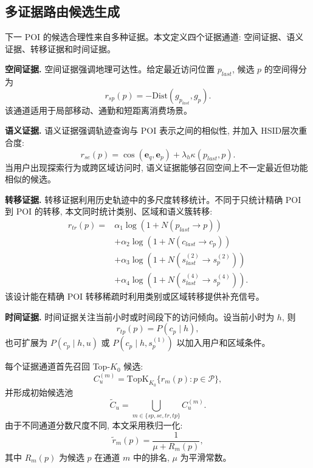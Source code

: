 \documentclass[10pt,twocolumn,fontset=none]{ctexart}
\newcommand{\hsid}{HSID}
\begin{document}
\subsection{多证据路由候选生成}
下一 POI 的候选合理性来自多种证据。本文定义四个证据通道: 空间证据、语义证据、转移证据和时间证据。

\textbf{空间证据.} 空间证据强调地理可达性。给定最近访问位置 $p_{last}$, 候选 $p$ 的空间得分为
\begin{equation}
    r_{sp}(p)=-\mathrm{Dist}(g_{p_{last}},g_p).
\end{equation}
该通道适用于局部移动、通勤和短距离消费场景。

\textbf{语义证据.} 语义证据强调轨迹查询与 POI 表示之间的相似性, 并加入 \hsid 层次重合度:
\begin{equation}
    r_{se}(p)=\cos(\bm e_q,\bm e_p)+\lambda_h\kappa(p_{last},p).
\end{equation}
当用户出现探索行为或跨区域访问时, 语义证据能够召回空间上不一定最近但功能相似的候选。

\textbf{转移证据.} 转移证据利用历史轨迹中的多尺度转移统计。不同于只统计精确 POI 到 POI 的转移, 本文同时统计类别、区域和语义簇转移:
\begin{equation}
\begin{split}
    r_{tr}(p)=&\alpha_1\log(1+N(p_{last}\rightarrow p))\\
    &+\alpha_2\log(1+N(c_{last}\rightarrow c_p))\\
    &+\alpha_3\log(1+N(s^{(2)}_{last}\rightarrow s^{(2)}_p))\\
    &+\alpha_4\log(1+N(s^{(4)}_{last}\rightarrow s^{(4)}_p)).
\end{split}
\end{equation}
该设计能在精确 POI 转移稀疏时利用类别或区域转移提供补充信号。

\textbf{时间证据.} 时间证据关注当前小时或时间段下的访问倾向。设当前小时为 $h$, 则
\begin{equation}
    r_{tp}(p)=P(c_p\mid h),
\end{equation}
也可扩展为 $P(c_p\mid h,u)$ 或 $P(c_p\mid h,s^{(1)}_p)$ 以加入用户和区域条件。

每个证据通道首先召回 Top-$K_0$ 候选:
\begin{equation}
    C^{(m)}_u=\mathrm{TopK}_{K_0}\{r_m(p):p\in\mathcal P\},
\end{equation}
并形成初始候选池
\begin{equation}
    \tilde C_u=\bigcup_{m\in\{sp,se,tr,tp\}} C^{(m)}_u.
\end{equation}
由于不同通道分数尺度不同, 本文采用秩归一化:
\begin{equation}
    \tilde r_m(p)=\frac{1}{\mu+R_m(p)},
\end{equation}
其中 $R_m(p)$ 为候选 $p$ 在通道 $m$ 中的排名, $\mu$ 为平滑常数。
\end{document}
